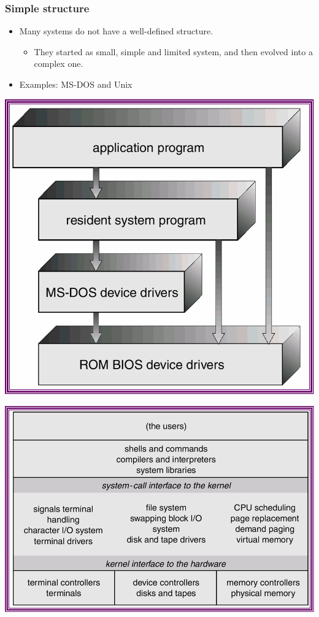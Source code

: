 \documentclass[CJKutf8,xcolor=pdftex,dvipsnames,table]{beamer}
\begin{document}
\begin{CJK*}{UTF8}{song}
  \begin{frame}
    \frametitle{Simple structure} \pause
    \begin{itemize}
    \item{Many systems do not have a well-defined structure.} \pause
      \begin{itemize}
      \item{They started as small, simple and limited system, and then evolved into a complex one.} \pause
      \end{itemize}
    \item{Examples: MS-DOS and Unix} \pause
    \end{itemize}
    \begin{minipage}[c]{0.5\textwidth}
      \includegraphics[scale=0.4]{v6f3-6} \pause
    \end{minipage}%
    \begin{minipage}[c]{0.5\textwidth}
      \includegraphics[scale=0.35]{v6f3-7}
    \end{minipage}
  \end{frame}


\end{CJK*}
\end{document}
